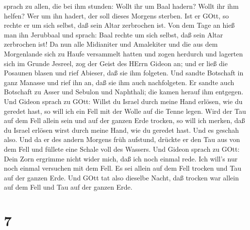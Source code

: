 sprach zu allen, die bei ihm stunden: Wollt ihr um Baal hadern? Wollt
ihr ihm helfen? Wer um ihn hadert, der soll dieses Morgens sterben. Ist
er GOtt, so rechte er um sich selbst, daß sein Altar zerbrochen ist.
 Von dem Tage an hieß man ihn Jerubbaal und sprach: Baal
rechte um sich selbst, daß sein Altar zerbrochen ist!  Da
nun alle Midianiter und Amalekiter und die aus dem Morgenlande sich zu
Haufe versammelt hatten und zogen herdurch und lagerten sich im Grunde
Jesreel,  zog der Geist des HErrn Gideon an; und er ließ
die Posaunen blasen und rief Abieser, daß sie ihm folgeten.
 Und sandte Botschaft in ganz Manasse und rief ihn an, daß
sie ihm auch nachfolgeten. Er sandte auch Botschaft zu Asser und Sebulon
und Naphthali; die kamen herauf ihm entgegen.  Und Gideon
sprach zu GOtt: Willst du Israel durch meine Hand erlösen, wie du
geredet hast,  so will ich ein Fell mit der Wolle auf die
Tenne legen. Wird der Tau auf dem Fell allein sein und auf der ganzen
Erde trocken, so will ich merken, daß du Israel erlösen wirst durch
meine Hand, wie du geredet hast.  Und es geschah also. Und
da er des andern Morgens früh aufstund, drückte er den Tau aus von dem
Fell und füllete eine Schale voll des Wassers.  Und Gideon
sprach zu GOtt: Dein Zorn ergrimme nicht wider mich, daß ich noch einmal
rede. Ich will's nur noch einmal versuchen mit dem Fell. Es sei allein
auf dem Fell trocken und Tau auf der ganzen Erde.  Und GOtt
tat also dieselbe Nacht, daß trocken war allein auf dem Fell und Tau auf
der ganzen Erde.

\hypertarget{section-6}{%
\section{7}\label{section-6}}

